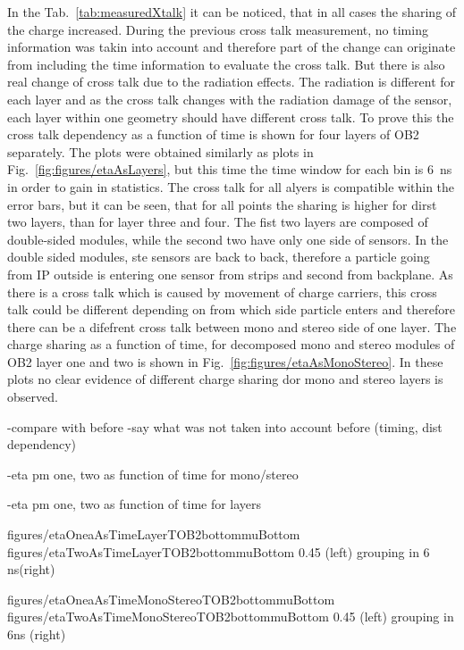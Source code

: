In the Tab.~\ref{tab:measuredXtalk} it can be noticed, that in all cases the sharing of the charge increased. During the previous cross talk measurement, no timing information was takin into account and therefore part of the change can originate from including the time information to evaluate the cross talk. But there is also real change of cross talk due to the radiation effects. The radiation is different for each layer and as the cross talk changes with the radiation damage of the sensor, each layer within one geometry should have different cross talk. To prove this the cross talk dependency as a function of time is shown for four layers of OB2 separately. The plots were obtained similarly as plots in Fig.~\ref{fig:figures/etaAsLayers}, but this time the time window for each bin is 6~ns in order to gain in statistics. The cross talk for all alyers is compatible within the error bars, but it can be seen, that for all points the sharing is higher for dirst two layers, than for layer three and four. The fist two layers are composed of double-sided modules, while the second two have only one side of sensors. In the double sided modules, ste sensors are back to back, therefore a particle going from IP outside is entering one sensor from strips and second from backplane. As there is a cross talk which is caused by movement of charge carriers, this cross talk could be different depending on from which side particle enters and therefore there can be a difefrent cross talk between mono and stereo side of one layer. The charge sharing as a function of time, for decomposed mono and stereo modules of OB2 layer one and two is shown in Fig.~\ref{fig:figures/etaAsMonoStereo}. In these plots no clear evidence of different charge sharing dor mono and stereo layers is observed.


-compare with before
-say what was not taken into account before (timing, dist dependency)

-eta pm one, two as function of time for mono/stereo %


-eta pm one, two as function of time for layers %


                 {figures/etaOneaAsTimeLayerTOB2bottommuBottom}
                 {figures/etaTwoAsTimeLayerTOB2bottommuBottom} %
                 {0.45}       %
                 {(left) grouping in 6 ns(right)}


                 {figures/etaOneaAsTimeMonoStereoTOB2bottommuBottom}
                 {figures/etaTwoAsTimeMonoStereoTOB2bottommuBottom} %
                 {0.45}       %
                 {(left) grouping in 6ns (right)}



